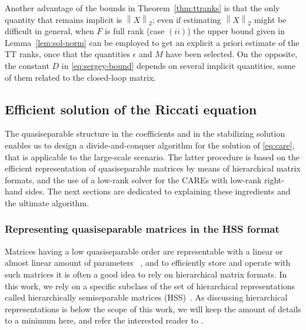 \documentclass[a4paper,10pt]{article}
\newcommand{\norm}[1]{\left\lVert#1\right\rVert}
\begin{document}
  Another advantage of the bounds in Theorem~\ref{thm:ttranks} is that the only quantity that remains implicit is $\norm{X}_2$; even if estimating $\norm{X}_2$  might be difficult in general,  when $F$ is full rank (case $(ii)$) the upper bound  given in Lemma~\ref{lem:sol-norm} can be employed to get an explicit a priori estimate of the TT ranks, once that the quantities $\epsilon$ and $M$ have been selected.  On the opposite,  the constant $D$ in \eqref{eq:sergey-bound} depends on several implicit quantities, some of them  related to the closed-loop matrix.
\subsection{Efficient solution of the Riccati equation}\label{sec:quasi-care-solve}
The quasiseparable structure in the coefficients and in the stabilizing solution enables us to design a divide-and-conquer algorithm for the solution of \eqref{eq:care}, that is applicable to the large-scale scenario. The latter procedure is based on the efficient representation of quasiseparable matrices by means of hierarchical matrix formats, and the use of a low-rank solver for the CAREs with low-rank right-hand sides. The next sections are dedicated to explaining these ingredients and the ultimate algorithm.


\subsubsection{Representing quasiseparable matrices in the HSS format}
Matrices having a low quasiseparable order are representable with a linear or almost linear amount of parameters ~\cite{vandebril08,eidelman14}, and to efficiently store and operate with such matrices it is often a good idea to rely on hierarchical matrix formats. In this work, we rely on a specific subclass of the set of hierarchical representations 
called hierarchically semiseparable matrices (HSS)~\cite{xia10}. As discussing hierarchical representations is below the scope of this work, we will keep the amount of details to a minimum here, and refer the interested reader to \cite{hackbusch15,xia10,xia2012complexity}.
\end{document}
